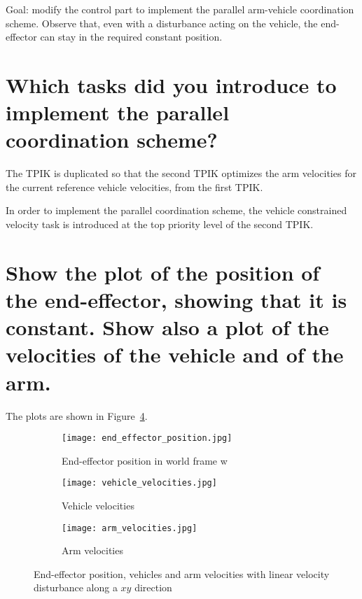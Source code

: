 	Goal: modify the control part to implement the parallel arm-vehicle
	coordination scheme. Observe that, even with a disturbance acting on the
	vehicle, the end-effector can stay in the required constant position.
	\begin{parts}
		\part{Which tasks did you introduce to implement the parallel
		coordination scheme?}
		\begin{solutionorbox}
			The TPIK is duplicated so that the second TPIK optimizes
			the arm velocities for the current reference vehicle
			velocities, from the first TPIK.

			In order to implement the parallel coordination scheme,
			the vehicle constrained velocity task is introduced at
			the top priority level of the second TPIK.
		\end{solutionorbox}

		\part{Show the plot of the position of the end-effector, showing
			that it is constant. Show also a plot of the velocities
		of the vehicle and of the arm.}

		\begin{solutionorbox}
			The plots are shown in Figure~\ref{fig:ex6_plots}.
		\end{solutionorbox}
		\begin{figure}[ht]
			\begin{subfigure}[b]{0.5\linewidth}
				\centering
				\texttt{[image: end\_effector\_position.jpg]}
				\caption{End-effector position in world frame
				\cframe w}%
				\label{subfig:ee_position}
			\end{subfigure}%
			\begin{subfigure}[b]{0.5\linewidth}
				\centering
				\texttt{[image: vehicle\_velocities.jpg]}
				\caption{Vehicle velocities}%
				\label{subfig:vehicle_velocities}
			\end{subfigure}
			\begin{subfigure}[b]{0.5\linewidth}
				\centering
				\texttt{[image: arm\_velocities.jpg]}
				\caption{Arm velocities}%
				\label{subfig:arm_velocities}
			\end{subfigure}

			\caption{End-effector position, vehicles and arm
			velocities with linear velocity disturbance along a $xy$
		direction}%
			\label{fig:ex6_plots}
		\end{figure}
		\label{part:ex6_2}

\end{parts}
